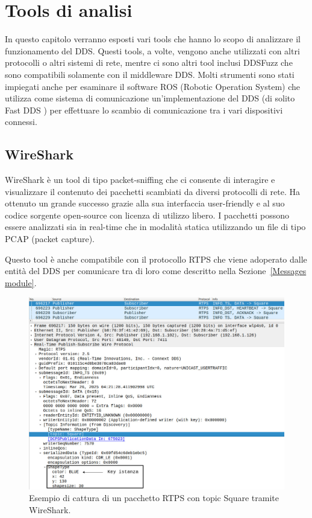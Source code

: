 \chapter{Tools di analisi}
In questo capitolo verranno esposti vari tools che hanno lo 
scopo di analizzare il funzionamento del DDS.
Questi tools,
a volte,
vengono anche utilizzati con altri protocolli o 
altri sistemi di rete, mentre ci sono altri tool inclusi DDSFuzz 
che sono compatibili solamente con il middleware DDS. Molti 
strumenti sono stati impiegati anche per esaminare il 
software ROS (Robotic Operation System) che utilizza come 
sistema di comunicazione un'implementazione del DDS 
(di solito Fast DDS \cite{FastDDS}) per effettuare lo scambio 
di comunicazione tra i vari dispositivi connessi.

\section{WireShark}
WireShark è un tool di tipo packet-sniffing che ci consente di 
interagire e visualizzare il contenuto dei pacchetti scambiati da 
diversi protocolli di rete. Ha ottenuto un grande successo 
grazie alla sua interfaccia user-friendly e al suo codice sorgente 
open-source con licenza di utilizzo libero. I pacchetti possono 
essere analizzati sia in real-time che in modalità statica utilizzando 
un file di tipo PCAP (packet capture). 

Questo tool è anche compatibile con il protocollo RTPS che viene
adoperato dalle entità del DDS per comunicare tra di loro 
come descritto nella Sezione~\ref{Messages module}.
\begin{figure}[H]
    \centering
    \includegraphics[width=15.2cm, keepaspectratio]{img/Info_ts e info_DST-Pagina-4.jpg}
    \caption{Esempio di cattura di un pacchetto RTPS con topic 
    Square tramite WireShark.}
    \label{wireskartshapesdemo}
\end{figure}

